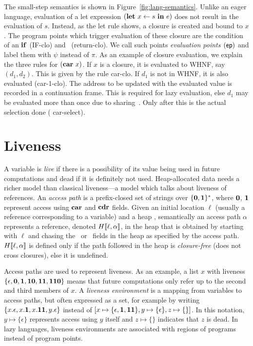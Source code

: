 \documentclass[preprint, 9pt]{sigplanconf}
\begin{document}
The small-step semantics  is shown in Figure~\ref{fig:lang-semantics}.
Unlike   an   eager  language,   evaluation   of   a  let   expression
$(\mbox{$\mathbf{ let}$}~x\leftarrow  s~\mbox{$\mathbf{ in}$}~e)$ does  not  result in  the evaluation  of
$s$. Instead,  as the {\sc let}  rule shows, a closure  is created and
bound to  $x$. The  program points which  trigger evaluation  of these
closure   are  the   condition  of   an  $\mbox{$\mathbf{ if}$}$   ({\sc  IF-clo})   and
\SRETURN\ ({\sc  return-clo}).  We  call such  points \emph{evaluation
  points   $(\mathsf{ep})$}  and   label  them   with  $\psi$   instead  of
$\pi$. As an  example of closure  evaluation, we  explain the
three rules for  $(\mbox{$\mathbf{car}$}~x)$.  If $x$ is a closure,  it is evaluated to
WHNF, say $(d_1, d_2)$.  This is  given by the rule {\sc car-clo}.  If
$d_1$ is  not in WHNF,  it is  also evaluated ({\sc  car-1-clo}).  The
address  to be  updated  with the  evaluated value  is
recorded  in  a  continuation  frame.    This  is  required  for  lazy
evaluation, else $d_1$ may  be evaluated more than once
due to  sharing~\cite{Jones87}.  Only after this  is the actual selection  done ({\sc
  car-select}).


\section{Liveness}
\label{sec:liveness}


A variable is {\em live} if there  is a possibility of its value being
used in  future computations and  dead if  it is definitely  not used.
Heap-allocated data  needs a richer model  than classical liveness---a
model which talks about liveness of references.  An {\em access path}
is a  prefix-closed set of strings  over $\{\mathbf{0},\mathbf{1}\}^\ast$, where
$\mathbf{0}$,  $\mathbf{1}$ represent  access  using $\mbox{$\mathbf{car}$}$  and $\mbox{$\mathbf{cdr}$}$  fields.
Given an initial location $\ell$ (usually a reference corresponding to
a variable)  and a  heap \heap, semantically  an access  path $\alpha$
represents     a      reference,     denoted     $H\llbracket\ell,
\alpha\rrbracket$,  in the  heap  that is  obtained  by starting  with
$\ell$ and chasing the \CAR\ or  \CDR\ fields in the heap as specified
by  the  access   path.   $H\llbracket\ell,  \alpha\rrbracket$  is
defined only if  the path followed in the  heap is \emph{closure-free}
(does not cross closures), else it is undefined.

Access paths are used to  represent liveness. As an example, a list
$x$ with 
liveness  $\{\epsilon,  \mathbf{0},  \mathbf{1},  \mathbf{1}\mathbf{0},
\mathbf{1}\mathbf{1},  \mathbf{1}\mathbf{1}\mathbf{0}\}$ means that future computations    only
refer up  to the  second and  third members of  $x$.  A  {\em liveness
  environment} is a mapping from  variables to access paths, but often
expressed as  a set,  for example  by writing  $\{x.\epsilon, x.\mathbf{1},
x.\mathbf{1}\mathbf{1},        y.\epsilon\}$        instead        of        $[x
  \mapsto\{\epsilon,\mathbf{1},\mathbf{1}\mathbf{1}\},          y\mapsto\{\epsilon\},
  z\mapsto\{\}]$.    In  this   notation,  $y   \mapsto  \{\epsilon\}$
represents access using $y$ itself and $z \mapsto \{\}$ indicates that
$z$ is dead.  In lazy  languages, liveness environments are associated
with regions of programs instead of program points.
\end{document}
